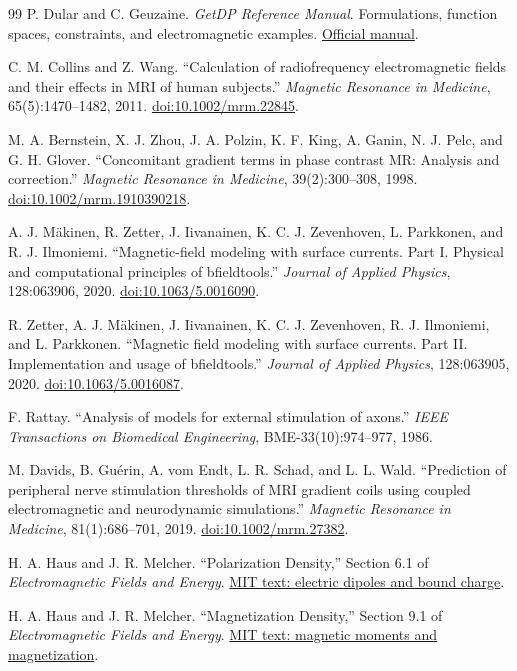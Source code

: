 \begin{thebibliography}{99}
 P. Dular and C. Geuzaine. \emph{GetDP Reference Manual}. Formulations, function spaces, constraints, and electromagnetic examples. \href{https://getdp.info/doc/texinfo/getdp.html}{Official manual}.

 C. M. Collins and Z. Wang. ``Calculation of radiofrequency electromagnetic fields and their effects in MRI of human subjects.'' \emph{Magnetic Resonance in Medicine}, 65(5):1470--1482, 2011. \href{https://doi.org/10.1002/mrm.22845}{doi:10.1002/mrm.22845}.

 M. A. Bernstein, X. J. Zhou, J. A. Polzin, K. F. King, A. Ganin, N. J. Pelc, and G. H. Glover. ``Concomitant gradient terms in phase contrast MR: Analysis and correction.'' \emph{Magnetic Resonance in Medicine}, 39(2):300--308, 1998. \href{https://doi.org/10.1002/mrm.1910390218}{doi:10.1002/mrm.1910390218}.

 A. J. M\"akinen, R. Zetter, J. Iivanainen, K. C. J. Zevenhoven, L. Parkkonen, and R. J. Ilmoniemi. ``Magnetic-field modeling with surface currents. Part I. Physical and computational principles of bfieldtools.'' \emph{Journal of Applied Physics}, 128:063906, 2020. \href{https://doi.org/10.1063/5.0016090}{doi:10.1063/5.0016090}.

 R. Zetter, A. J. M\"akinen, J. Iivanainen, K. C. J. Zevenhoven, R. J. Ilmoniemi, and L. Parkkonen. ``Magnetic field modeling with surface currents. Part II. Implementation and usage of bfieldtools.'' \emph{Journal of Applied Physics}, 128:063905, 2020. \href{https://doi.org/10.1063/5.0016087}{doi:10.1063/5.0016087}.

 F. Rattay. ``Analysis of models for external stimulation of axons.'' \emph{IEEE Transactions on Biomedical Engineering}, BME-33(10):974--977, 1986.

 M. Davids, B. Gu\'erin, A. vom Endt, L. R. Schad, and L. L. Wald. ``Prediction of peripheral nerve stimulation thresholds of MRI gradient coils using coupled electromagnetic and neurodynamic simulations.'' \emph{Magnetic Resonance in Medicine}, 81(1):686--701, 2019. \href{https://doi.org/10.1002/mrm.27382}{doi:10.1002/mrm.27382}.

 H. A. Haus and J. R. Melcher. ``Polarization Density,'' Section 6.1 of \emph{Electromagnetic Fields and Energy}. \href{https://web.mit.edu/6.013_book/www/chapter6/6.1.html}{MIT text: electric dipoles and bound charge}.

 H. A. Haus and J. R. Melcher. ``Magnetization Density,'' Section 9.1 of \emph{Electromagnetic Fields and Energy}. \href{https://web.mit.edu/6.013_book/www/chapter9/9.1.html}{MIT text: magnetic moments and magnetization}.


\end{thebibliography}
